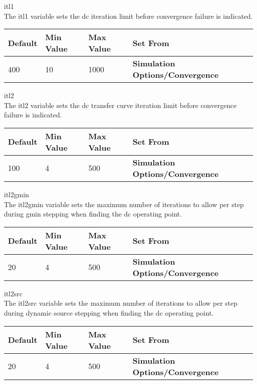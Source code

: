 \begin{description}
\item{\et itl1}\\
The {\et itl1} variable sets the dc iteration limit before convergence
failure is indicated.

\begin{tabular}{|l|l|l|l|}\hline
\bf Default & \bf Min Value & \bf Max Value & \bf Set From\\ \hline
400 & 10 & 1000 & \bf Simulation Options/Convergence\\ \hline
\end{tabular}
 
\item{\et itl2}\\
The {\et itl2} variable sets the dc transfer curve iteration limit
before convergence failure is indicated.

\begin{tabular}{|l|l|l|l|}\hline
\bf Default & \bf Min Value & \bf Max Value & \bf Set From\\ \hline
100 & 4 & 500 & \bf Simulation Options/Convergence\\ \hline
\end{tabular}

\item{\et itl2gmin}\\
The {\et itl2gmin} variable sets the maximum number of iterations to
allow per step during gmin stepping when finding the dc operating
point.

\begin{tabular}{|l|l|l|l|}\hline
\bf Default & \bf Min Value & \bf Max Value & \bf Set From\\ \hline
20 & 4 & 500 & \bf Simulation Options/Convergence\\ \hline
\end{tabular}

\item{\et itl2src}\\
The {\et itl2src} variable sets the maximum number of iterations to
allow per step during dynamic source stepping when finding the dc
operating point.

\begin{tabular}{|l|l|l|l|}\hline
\bf Default & \bf Min Value & \bf Max Value & \bf Set From\\ \hline
20 & 4 & 500 & \bf Simulation Options/Convergence\\ \hline
\end{tabular}


\end{description}
